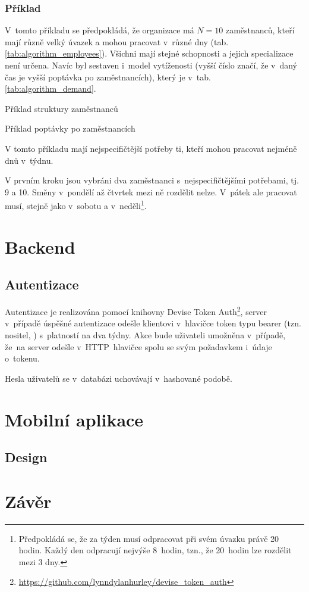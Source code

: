 \documentclass[twoside]{ctuthesis}
\begin{document}
\subsection{Příklad}
V~tomto příkladu se předpokládá, že organizace má $N = 10$ zaměstnanců, kteří mají různě velký úvazek a mohou pracovat v~různé dny (tab. \ref{tab:algorithm_employees}). Všichni mají stejné schopnosti a jejich specializace není určena. Navíc byl sestaven i~model vytíženosti (vyšší číslo značí, že v~daný čas je vyšší poptávka po zaměstnancích), který je v~tab. \ref{tab:algorithm_demand}.
\begin{table}[h]
	
	\caption{Příklad struktury zaměstnanců}
	\label{tab:algorithm_employees}
\end{table}

\begin{table}[h]
	
	\caption{Příklad poptávky po zaměstnancích}
	\label{tab:algorithm_demand}
\end{table}

V tomto příkladu mají nejspecifičtější potřeby ti, kteří mohou pracovat nejméně dnů v~týdnu.

V prvním kroku jsou vybráni dva zaměstnanci s~nejspecifičtějšími potřebami, tj. 9 a 10. Směny v~pondělí až čtvrtek mezi ně rozdělit nelze. V~pátek ale pracovat musí, stejně jako v~sobotu a v~neděli\footnote{Předpokládá se, že za týden musí odpracovat při svém úvazku právě 20 hodin. Každý den odpracují nejvýše 8~hodin, tzn., že 20~hodin lze rozdělit mezi 3 dny.}.


\chapter{Backend}


\section{Autentizace}
Autentizace je realizována pomocí knihovny Devise Token Auth\footnote{\url{https://github.com/lynndylanhurley/devise_token_auth}}, server v~případě úspěšné autentizace odešle klientovi v~hlavičce token typu bearer (tzn. nositel,  \cite{swagger2020bearer}) s~platností na dva týdny. Akce bude uživateli umožněna v~případě, že~na server odešle v~HTTP~hlavičce spolu se svým požadavkem i~údaje o~tokenu.

Hesla uživatelů se v~databázi uchovávají v~hashované podobě.



\chapter{Mobilní aplikace}


\section{Design}



\chapter{Závěr}

\printbibliography[title={Seznam použité literatury}]
\end{document}
